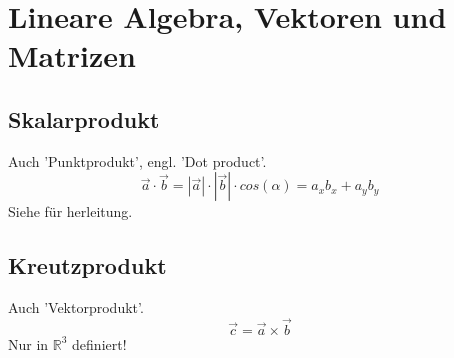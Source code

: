 \chapter{Lineare Algebra, Vektoren und Matrizen}



\section{Skalarprodukt}
Auch 'Punktprodukt', engl. 'Dot product'.
$$\vec{a}\cdot \vec{b} = |\vec{a}|\cdot |\vec{b}|\cdot cos(\alpha) = a_x b_x + a_y b_y$$
Siehe \citep[p.~45]{Westermmann2008}  für herleitung.

\section{Kreutzprodukt}
Auch 'Vektorprodukt'. 
$$ \vec{c} = \vec{a} \times \vec{b}$$
Nur in $\mathbb{R}^3$ definiert!